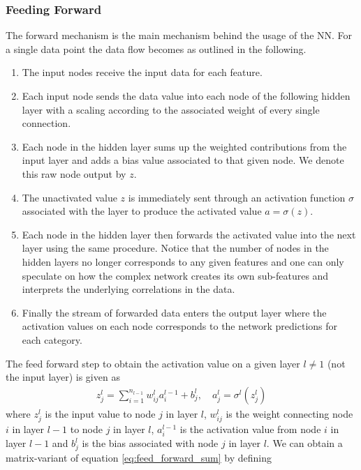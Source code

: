 \subsubsection{Feeding Forward} 
The forward mechanism is the main mechanism behind the usage of the \ac{NN}.
For a single data point the data flow becomes as outlined in the following.
\begin{enumerate}
    \item The input nodes receive the input data for each feature. 
    \item Each input node sends the data value into each node of the following hidden layer with a scaling according to the associated weight of every single connection. 
    \item Each node in the hidden layer sums up the weighted contributions from the input layer and adds a bias value associated to that given node. We denote this raw node output by $z$.
    \item The unactivated value $z$ is immediately sent through an activation function $\sigma$ associated with the layer to produce the activated value $a = \sigma(z)$.
    \item Each node in the hidden layer then forwards the activated value into the next layer using the same procedure. Notice that the number of nodes in the hidden layers no longer corresponds to any given features and one can only speculate on how the complex network creates its own sub-features and interprets the underlying correlations in the data. 
    \item Finally the stream of forwarded data enters the output layer where the activation values on each node corresponds to the network predictions for each category. 
\end{enumerate}
The feed forward step to obtain the activation value on a given layer $l\ne 1$ (not the input layer) is given as
\begin{align}
    z_j^l = \sum_{i = 1}^{n_{l-1}} w_{ij}^l a_i^{l-1} + b_j^l, \quad a_j^l = \sigma^l(z_j^l)
    \label{eq:feed_forward_sum}
\end{align}
where $z_j^l$ is the input value to node $j$ in layer $l$, $w_{ij}^l$ is the weight connecting node $i$ in layer $l-1$ to node $j$ in layer $l$, $a_i^{l-1}$ is the activation value from node $i$ in layer $l-1$ and $b_j^l$ is the bias associated with node $j$ in layer $l$. We can obtain a matrix-variant of equation \ref{eq:feed_forward_sum} by defining
